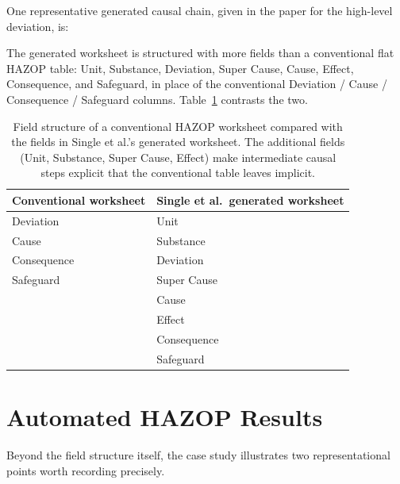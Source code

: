 One representative generated causal chain, given in the paper for the high-level deviation, is:

\begin{center}
%
\end{center}

The generated worksheet is structured with more fields than a conventional flat HAZOP table: Unit, Substance, Deviation, Super Cause, Cause, Effect, Consequence, and Safeguard, in place of the conventional Deviation / Cause / Consequence / Safeguard columns. Table~\ref{tab:w2-worksheet-fields} contrasts the two.

\begin{table}[htbp]
\centering
\caption[Conventional vs.\ generated worksheet fields]{Field structure of a conventional HAZOP worksheet compared with the fields in Single et al.'s generated worksheet. The additional fields (Unit, Substance, Super Cause, Effect) make intermediate causal steps explicit that the conventional table leaves implicit.}
\label{tab:w2-worksheet-fields}
\small
\begin{tabularx}{\columnwidth}{@{}>{\raggedright\arraybackslash}X>{\raggedright\arraybackslash}X@{}}
\toprule
\textbf{Conventional worksheet} & \textbf{Single et al.\ generated worksheet} \\
\midrule
Deviation & Unit \\
Cause & Substance \\
Consequence & Deviation \\
Safeguard & Super Cause \\
 & Cause \\
 & Effect \\
 & Consequence \\
 & Safeguard \\
\bottomrule
\end{tabularx}
\end{table}

\section{Automated HAZOP Results}
Beyond the field structure itself, the case study illustrates two representational points worth recording precisely.

